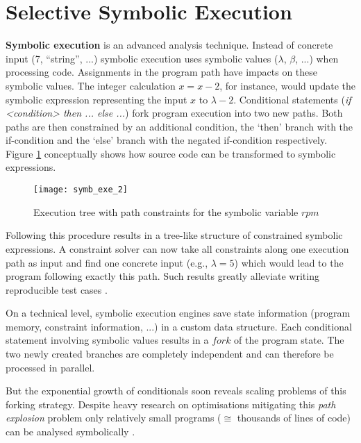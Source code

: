 \section{Selective Symbolic Execution}\label{sec:s2e}



\textbf{Symbolic execution} is an advanced analysis technique.
Instead of concrete input (7, ``string'', ...) symbolic execution uses symbolic values ($\lambda$, $\beta$, ...) when processing code.
Assignments in the program path have impacts on these symbolic values.
The integer calculation $x = x - 2$, for instance, would update the symbolic expression representing the input $x$ to $\lambda - 2$.
Conditional statements (\textit{if <condition> then ... else ...}) fork program execution into two new paths.
Both paths are then constrained by an additional condition, the `then' branch with the if-condition and the `else' branch with the negated if-condition respectively.
Figure \ref{fig:introex} conceptually shows how source code can be transformed to symbolic expressions.


\begin{figure}
\texttt{[image: symb\_exe\_2]}
\caption{Execution tree with path constraints for the symbolic variable $rpm$ \cite{chip14s2e}}
\label{fig:introex}
\end{figure}

Following this procedure results in a tree-like structure of constrained symbolic expressions.
A constraint solver can now take all constraints along one execution path as input and find one concrete input (e.g., $\lambda = 5$) which would lead to the program following exactly this path.
Such results greatly alleviate writing reproducible test cases \cite{chip09sel}.

On a technical level, symbolic execution engines save state information (program memory, constraint information, ...) in a custom data structure.
Each conditional statement involving symbolic values results in a $fork$ of the program state.
The two newly created branches are completely independent and can therefore be processed in parallel.

But the exponential growth of conditionals soon reveals scaling problems of this forking strategy.
Despite heavy research on optimisations mitigating this \textit{path explosion} problem
only relatively small programs ($\cong$ thousands of lines of code) can be analysed symbolically \cite{chip09sel}.

